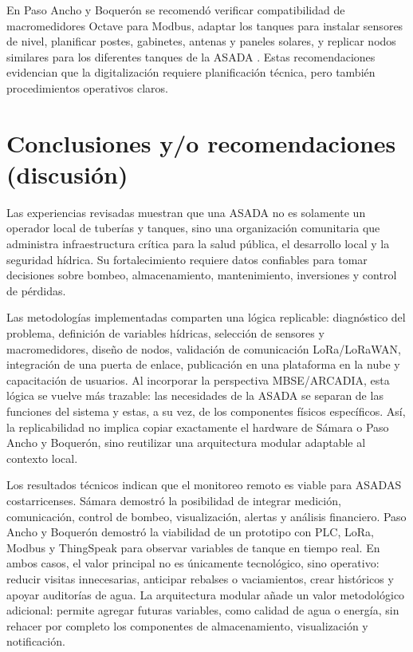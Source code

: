 \documentclass[12pt,letterpaper]{article}
\begin{document}
En Paso Ancho y Boquerón se recomendó verificar compatibilidad de macromedidores Octave para Modbus, adaptar los tanques para instalar sensores de nivel, planificar postes, gabinetes, antenas y paneles solares, y replicar nodos similares para los diferentes tanques de la ASADA \cite{oviedo2024}. Estas recomendaciones evidencian que la digitalización requiere planificación técnica, pero también procedimientos operativos claros.

\section{Conclusiones y/o recomendaciones (discusión)}
Las experiencias revisadas muestran que una ASADA no es solamente un operador local de tuberías y tanques, sino una organización comunitaria que administra infraestructura crítica para la salud pública, el desarrollo local y la seguridad hídrica. Su fortalecimiento requiere datos confiables para tomar decisiones sobre bombeo, almacenamiento, mantenimiento, inversiones y control de pérdidas.

Las metodologías implementadas comparten una lógica replicable: diagnóstico del problema, definición de variables hídricas, selección de sensores y macromedidores, diseño de nodos, validación de comunicación LoRa/LoRaWAN, integración de una puerta de enlace, publicación en una plataforma en la nube y capacitación de usuarios. Al incorporar la perspectiva MBSE/ARCADIA, esta lógica se vuelve más trazable: las necesidades de la ASADA se separan de las funciones del sistema y estas, a su vez, de los componentes físicos específicos. Así, la replicabilidad no implica copiar exactamente el hardware de Sámara o Paso Ancho y Boquerón, sino reutilizar una arquitectura modular adaptable al contexto local.

Los resultados técnicos indican que el monitoreo remoto es viable para ASADAS costarricenses. Sámara demostró la posibilidad de integrar medición, comunicación, control de bombeo, visualización, alertas y análisis financiero. Paso Ancho y Boquerón demostró la viabilidad de un prototipo con PLC, LoRa, Modbus y ThingSpeak para observar variables de tanque en tiempo real. En ambos casos, el valor principal no es únicamente tecnológico, sino operativo: reducir visitas innecesarias, anticipar rebalses o vaciamientos, crear históricos y apoyar auditorías de agua. La arquitectura modular añade un valor metodológico adicional: permite agregar futuras variables, como calidad de agua o energía, sin rehacer por completo los componentes de almacenamiento, visualización y notificación.
\end{document}

